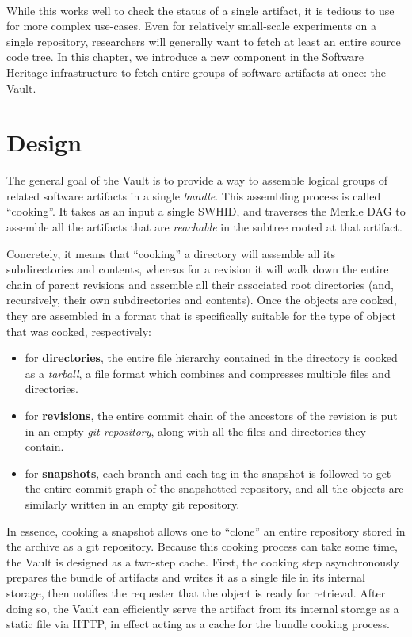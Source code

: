~

While this works well to check the status of a single artifact, it is tedious
to use for more complex use-cases. Even for relatively small-scale experiments
on a single repository, researchers will generally want to fetch at least an
entire source code tree.  In this chapter, we introduce a new component in the
Software Heritage infrastructure to fetch entire groups of software artifacts
at once: the Vault.

\section{Design}

The general goal of the Vault is to provide a way to assemble logical groups of
related software artifacts in a single \emph{bundle}. This assembling process
is called ``cooking''. It takes as an input a single \gls{SWHID}, and traverses
the Merkle DAG to assemble all the artifacts that are \emph{reachable} in the
subtree rooted at that artifact.

Concretely, it means that ``cooking'' a directory will assemble all its
subdirectories and contents, whereas for a revision it will walk down the
entire chain of parent revisions and assemble all their associated root
directories (and, recursively, their own subdirectories and contents).
Once the objects are cooked, they are assembled in a format that is
specifically suitable for the type of object that was cooked, respectively:

\begin{itemize}
    \item for \textbf{directories}, the entire file hierarchy contained in the
        directory is cooked as a \emph{tarball}, a file format which combines
        and compresses multiple files and directories.
    \item for \textbf{revisions}, the entire commit chain of the ancestors of
        the revision is put in an empty \emph{git repository}, along with all
        the files and directories they contain.
    \item for \textbf{snapshots}, each branch and each tag in the snapshot is
        followed to get the entire commit graph of the snapshotted repository,
        and all the objects are similarly written in an empty git repository.
\end{itemize}

In essence, cooking a snapshot allows one to ``clone'' an entire repository
stored in the archive as a git repository. Because this cooking process can
take some time, the Vault is designed as a two-step cache. First, the cooking
step asynchronously prepares the bundle of artifacts and writes it as a single
file in its internal storage, then notifies the requester that the object is
ready for retrieval. After doing so, the Vault can efficiently serve the
artifact from its internal storage as a static file via HTTP, in effect acting
as a cache for the bundle cooking process.

